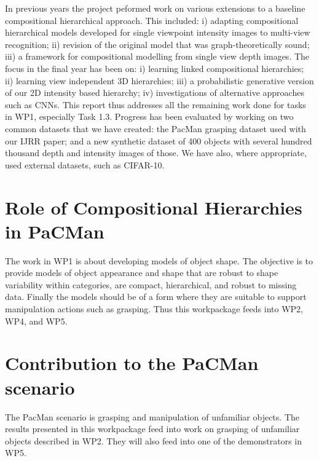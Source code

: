 \documentclass[a4paper,11pt,pdf]{pacmanreport}
\begin{document}
In previous years the project peformed work on various extensions to a baseline compositional hierarchical approach. This included: i) adapting compositional hierarchical models developed for single viewpoint intensity images to multi-view recognition; ii) revision of the original model that was graph-theoretically sound; iii) a framework for compositional modelling from single view depth images. The focus in the final year has been on: i) learning linked compositional hierarchies; ii) learning view independent 3D hierarchies; iii) a probabilistic generative version of our 2D intensity based hierarchy; iv) investigations of alternative approaches such as CNNs. This report thus addresses all the remaining work done for tasks in WP1, especially Task 1.3. Progress has been evaluated by working on two common datasets that we have created: the PacMan grasping dataset used with our IJRR paper; and a new synthetic dataset of 400 objects with several hundred thousand depth and intensity images of those. We have also, where appropriate, used external datasets, such as CIFAR-10.

\section*{Role of Compositional Hierarchies in PaCMan}

The work in WP1 is about developing models of object shape. The objective is to provide models of object appearance and shape that are robust to shape variability within categories, are compact, hierarchical, and robust to missing data. Finally the models should be of a form where they are suitable to support manipulation actions such as grasping. Thus this workpackage feeds into WP2, WP4, and WP5.

\section*{Contribution to the PaCMan scenario}

The PacMan scenario is grasping and manipulation of unfamiliar objects. The results presented in this workpackage feed into work on grasping of unfamiliar objects described in WP2. They will also feed into one of the demonstrators in WP5.
\end{document}
